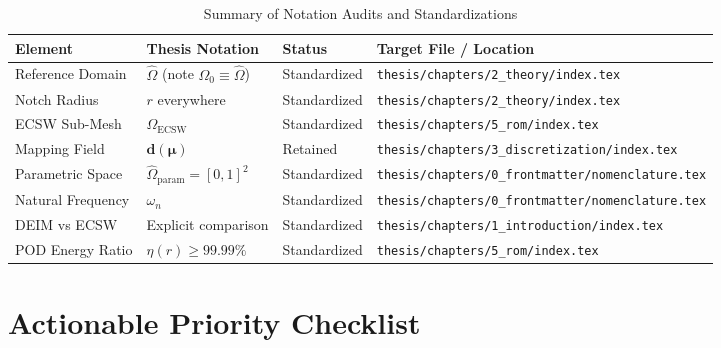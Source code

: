 \documentclass[11pt,a4paper]{article}
\begin{document}
\begin{table}[htbp]
\centering
\caption{Summary of Notation Audits and Standardizations}
\vspace{0.5em}
\small
\begin{tabularx}{\textwidth}{>{\raggedright\arraybackslash}p{2.5cm} >{\raggedright\arraybackslash}p{2.5cm} >{\raggedright\arraybackslash}p{2.5cm} >{\raggedright\arraybackslash}X}
\toprule
\textbf{Element} & \textbf{Thesis Notation} & \textbf{Status} & \textbf{Target File / Location} \\
\midrule
Reference Domain & $\hat{\Omega}$ (note $\Omega_0 \equiv \hat{\Omega}$) & Standardized & \texttt{thesis/chapters/2\_theory/index.tex} \\
\addlinespace
Notch Radius & $r$ everywhere & Standardized & \texttt{thesis/chapters/2\_theory/index.tex} \\
\addlinespace
ECSW Sub-Mesh & $\Omega_{\text{ECSW}}$ & Standardized & \texttt{thesis/chapters/5\_rom/index.tex} \\
\addlinespace
Mapping Field & $\mathbf{d}(\boldsymbol{\mu})$ & Retained & \texttt{thesis/chapters/3\_discretization/index.tex} \\
\addlinespace
Parametric Space & $\hat{\Omega}_{\text{param}} = [0,1]^2$ & Standardized & \texttt{thesis/chapters/0\_frontmatter/nomenclature.tex} \\
\addlinespace
Natural Frequency & $\omega_n$ & Standardized & \texttt{thesis/chapters/0\_frontmatter/nomenclature.tex} \\
\addlinespace
DEIM vs ECSW & Explicit comparison & Standardized & \texttt{thesis/chapters/1\_introduction/index.tex} \\
\addlinespace
POD Energy Ratio & $\eta(r) \ge 99.99\%$ & Standardized & \texttt{thesis/chapters/5\_rom/index.tex} \\
\bottomrule
\end{tabularx}
\end{table}

\section{Actionable Priority Checklist}
\end{document}
